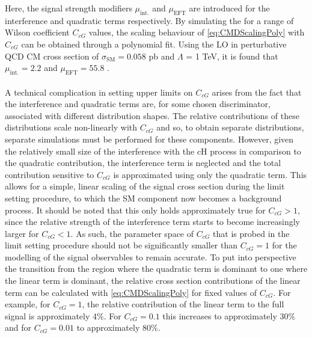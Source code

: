 Here, the signal strength modifiers $\mu_{\mathrm{int.}}$ and $\mu_{\mathrm{EFT}}$ are introduced for the interference and quadratic terms respectively. By simulating the \cHZZCMD for a range of Wilson coefficient $C_{cG}$ values, the scaling behaviour of \autoref{eq:CMDScalingPoly} with $C_{cG}$ can be obtained through a polynomial fit. Using the LO in perturbative QCD CM cross section of $\sigma_{\mathrm{SM}} = 0.058$ pb and $\Lambda$ = 1 TeV, it is found that $\mu_{\mathrm{int.}}=2.2$ and $\mu_{\mathrm{EFT}}=55.8$ \cite{PhenoPaper}. \\
\\
A technical complication in setting upper limits on $C_{cG}$ arises from the fact that the interference and quadratic terms are, for some chosen discriminator, associated with different distribution shapes. The relative contributions of these distributions scale non-linearly with $C_{cG}$ and so, to obtain separate distributions, separate simulations must be performed for these components. However, given the relatively small size of the interference with the cH process in comparison to the quadratic contribution, the interference term is neglected and the total contribution sensitive to $C_{cG}$ is approximated using only the quadratic term. This allows for a simple, linear scaling of the signal cross section during the limit setting procedure, to which the SM component now becomes a background process. It should be noted that this only holds approximately true for $C_{cG} > 1$, since the relative strength of the interference term starts to become increasingly larger for $C_{cG} < 1$. As such, the parameter space of  $C_{cG}$ that is probed in the limit setting procedure should not be significantly smaller than $C_{cG} = 1$ for the modelling of the signal observables to remain accurate. To put into perspective the transition from the region where the quadratic term is dominant to one where the linear term is dominant, the relative cross section contributions of the linear term can be calculated with \autoref{eq:CMDScalingPoly} for fixed values of $C_{cG}$. For example, for $C_{cG} = 1$, the relative contribution of the linear term to the full \cHZZCMD\, signal is approximately 4\%. For $C_{cG} = 0.1$ this increases to approximately 30\% and for $C_{cG} = 0.01$ to approximately 80\%. 

